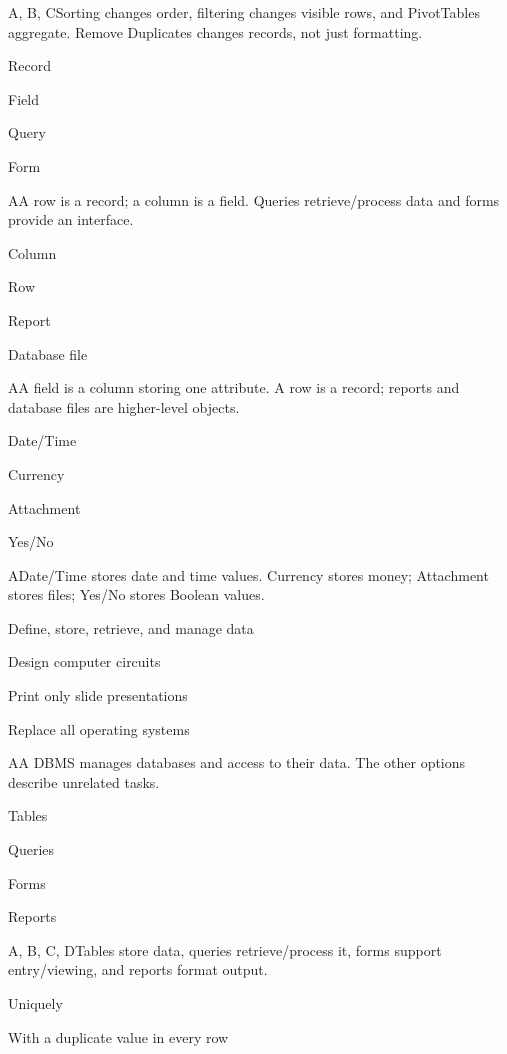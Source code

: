 \begin{enumerate}[label=\textbf{Q\arabic*.}, leftmargin=*]
  {A, B, C}{Sorting changes order, filtering changes visible rows, and PivotTables aggregate. Remove Duplicates changes records, not just formatting.}
\fi
\ifnum{}
  {\item Record
   \item Field
   \item Query
   \item Form}
  {A}{A row is a record; a column is a field. Queries retrieve/process data and forms provide an interface.}
  {\item Column
   \item Row
   \item Report
   \item Database file}
  {A}{A field is a column storing one attribute. A row is a record; reports and database files are higher-level objects.}
  {\item Date/Time
   \item Currency
   \item Attachment
   \item Yes/No}
  {A}{Date/Time stores date and time values. Currency stores money; Attachment stores files; Yes/No stores Boolean values.}
  {\item Define, store, retrieve, and manage data
   \item Design computer circuits
   \item Print only slide presentations
   \item Replace all operating systems}
  {A}{A DBMS manages databases and access to their data. The other options describe unrelated tasks.}
  {\item Tables
   \item Queries
   \item Forms
   \item Reports}
  {A, B, C, D}{Tables store data, queries retrieve/process it, forms support entry/viewing, and reports format output.}
\fi
\ifnum{}
  {\item Uniquely
   \item With a duplicate value in every row
}
\end{enumerate}
